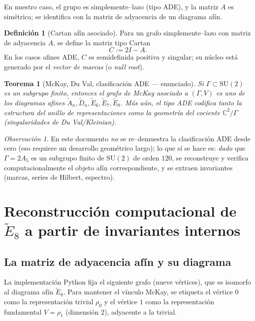 \documentclass[11pt,a4paper]{article}
\newtheorem{theorem}{Teorema}
\theoremstyle{definition}
\newtheorem{definition}{Definición}
\theoremstyle{remark}
\newtheorem{remark}{Observación}
\begin{document}
En nuestro caso, el grupo es simplemente--lazo (tipo ADE), y la matriz $A$ es simétrica; se identifica con la matriz de adyacencia de un diagrama afín.

\begin{definition}[Cartan afín asociado]
Para un grafo simplemente--lazo con matriz de adyacencia $A$, se define la matriz tipo Cartan
\[
C := 2I - A.
\]
En los casos afines ADE, $C$ es semidefinida positiva y singular; su núcleo está generado por el \emph{vector de marcas} (o \emph{null root}).
\end{definition}

\begin{theorem}[McKay, Du Val, clasificación ADE — enunciado]
Si $\Gamma\subset \mathrm{SU}(2)$ es un subgrupo finito, entonces el grafo de McKay asociado a $(\Gamma,V)$ es uno de los diagramas afines $\widetilde{A}_n,\widetilde{D}_n,\widetilde{E}_6,\widetilde{E}_7,\widetilde{E}_8$.
Más aún, el tipo ADE codifica tanto la estructura del anillo de representaciones como la geometría del cociente $\mathbb C^2/\Gamma$ (singularidades de Du Val/Kleinian).
\end{theorem}

\begin{remark}
En este documento \emph{no} se re--demuestra la clasificación ADE desde cero (eso requiere un desarrollo geométrico largo);
lo que sí se hace es: \emph{dado} que $\Gamma=2A_5$ es un subgrupo finito de $\mathrm{SU}(2)$ de orden $120$,
se reconstruye y verifica computacionalmente el objeto afín correspondiente, y se extraen invariantes (marcas, series de Hilbert, espectro).
\end{remark}

\section{Reconstrucción computacional de $\widetilde{E}_8$ a partir de invariantes internos}
\subsection{La matriz de adyacencia afín y su diagrama}
La implementación Python fija el siguiente grafo (nueve vértices), que es isomorfo al diagrama afín $\widetilde{E}_8$.
Para mantener el vínculo McKay, se etiqueta el vértice $0$ como la representación trivial $\rho_0$ y el vértice $1$ como la representación fundamental $V=\rho_1$ (dimensión 2), adyacente a la trivial.
\end{document}
